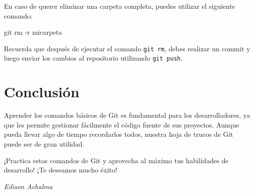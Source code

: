 \documentclass[
  letterpaper,
  DIV=11,
  numbers=noendperiod]{scrartcl}
\newenvironment{Shaded}{}{}
\newcommand{\AttributeTok}[1]{\textcolor[rgb]{0.84,0.23,0.29}{#1}}
\newcommand{\FunctionTok}[1]{\textcolor[rgb]{0.44,0.26,0.76}{#1}}
\newcommand{\NormalTok}[1]{\textcolor[rgb]{0.14,0.16,0.18}{#1}}
\begin{document}
En caso de querer eliminar una carpeta completa, puedes utilizar el
siguiente comando:

\begin{Shaded}
\begin{Highlighting}[]
\FunctionTok{git}\NormalTok{ rm }\AttributeTok{{-}r}\NormalTok{ micarpeta}
\end{Highlighting}
\end{Shaded}

Recuerda que después de ejecutar el comando \texttt{git\ rm}, debes
realizar un commit y luego enviar los cambios al repositorio utilizando
\texttt{git\ push}.

\hypertarget{conclusiuxf3n}{%
\section{Conclusión}\label{conclusiuxf3n}}

Aprender los comandos básicos de Git es fundamental para los
desarrolladores, ya que les permite gestionar fácilmente el código
fuente de sus proyectos. Aunque pueda llevar algo de tiempo recordarlos
todos, nuestra hoja de trucos de Git puede ser de gran utilidad.

¡Practica estos comandos de Git y aprovecha al máximo tus habilidades de
desarrollo! ¡Te deseamos mucho éxito!

\emph{Edison Achalma}


\printbibliography
\end{document}
